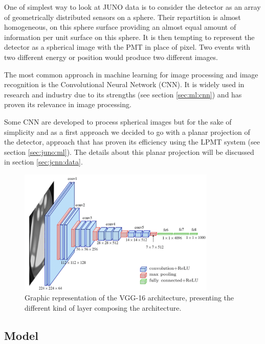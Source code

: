 One of simplest way to look at JUNO data is to consider the detector as an array of geometrically distributed sensors on a sphere. Their repartition is almost homogeneous, on this sphere surface providing an almost equal amount of information per unit surface on this sphere. It is then tempting to represent the detector as a spherical image with the PMT in place of pixel. Two events with two different energy or position would produce two different images.

The most common approach in machine learning for image processing and image recognition is the Convolutional Neural Network (CNN). It is widely used in research and industry \cite{simonyan_very_2015, ciresan_multi-column_2012, abbasi_convolutional_2021, maksimovic_cnns_2021} due to its strengths (see section \ref{sec:ml:cnn}) and has proven its relevance in image processing.

Some CNN are developed to process spherical images \cite{cohen_spherical_2018} but for the sake of simplicity and as a first approach we decided to go with a planar projection of the detector, approach that has proven its efficiency using the LPMT system (see section \ref{sec:juno:ml}). The details about this planar projection will be discussed in section \ref{sec:jcnn:data}.

\begin{figure}[ht]
  \centering
  \includegraphics[height=6cm]{images/jcnn/vgg16.png}
  \caption{Graphic representation of the VGG-16 architecture, presenting the different kind of layer composing the architecture.}
  \label{fig:jcnn:vgg16}
\end{figure}

\subsection{Model}
\label{sec:jcnn:model}

